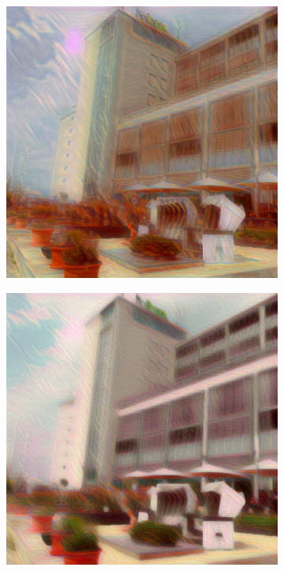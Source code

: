 \begin{figure}[H]
\begin{subfigure}[h]{0.15\textwidth}
    \end{subfigure}
    \begin{subfigure}[h]{0.15\textwidth}
        \centering
        \includegraphics[width=\textwidth]{resources/content/experiments/b__the_scream__768x768__style-weight_1e+07__tv-weight_1e-05.jpg}
    \end{subfigure}
    \begin{subfigure}[h]{0.15\textwidth}
        \centering
        \includegraphics[width=\textwidth]{resources/content/experiments/b__the_scream__768x768__style-weight_1e+07__tv-weight_1e-04.jpg}

\end{subfigure}
\end{figure}
